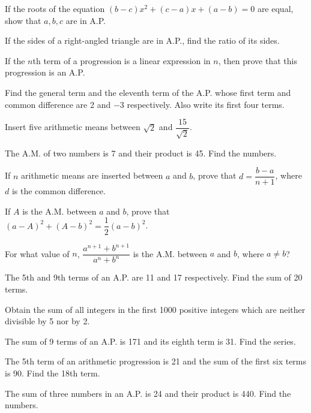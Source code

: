 \documentclass[11pt,a4paper]{article}
\begin{document}
\begin{longlist}
\item If the roots of the equation $(b-c)x^2+(c-a)x+(a-b)=0$ are equal, show that $a,b,c$ are in A.P.

\item If the sides of a right-angled triangle are in A.P., find the ratio of its sides.

\item If the $n$th term of a progression is a linear expression in $n$, then prove that this progression is an A.P.

\item Find the general term and the eleventh term of the A.P. whose first term and common difference are 2 and $-3$ respectively. Also write its first four terms.

\item Insert five arithmetic means between $\sqrt2$ and $\dfrac{15}{\sqrt2}$.

\item The A.M. of two numbers is 7 and their product is 45. Find the numbers.

\item If $n$ arithmetic means are inserted between $a$ and $b$, prove that $d=\dfrac{b-a}{n+1}$, where $d$ is the common difference.

\item If $A$ is the A.M. between $a$ and $b$, prove that $(a-A)^2+(A-b)^2=\dfrac{1}{2}(a-b)^2$.

\item For what value of $n$, $\dfrac{a^{n+1}+b^{n+1}}{a^n+b^n}$ is the A.M. between $a$ and $b$, where $a\neq b$?

\item The 5th and 9th terms of an A.P. are 11 and 17 respectively. Find the sum of 20 terms.

\item Obtain the sum of all integers in the first 1000 positive integers which are neither divisible by 5 nor by 2.

\item The sum of 9 terms of an A.P. is 171 and its eighth term is 31. Find the series.

\item The 5th term of an arithmetic progression is 21 and the sum of the first six terms is 90. Find the 18th term.

\item The sum of three numbers in an A.P. is 24 and their product is 440. Find the numbers.


\end{longlist}
\end{document}

